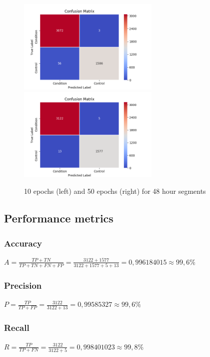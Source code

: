 \begin{figure}
      \begin{multicols}{2}
            \includegraphics[height=4.5cm]{img/control_condition/conf_2880_60_10_32.png}
            \includegraphics[height=4.5cm]{img/control_condition/conf_2880_60_50_32.png}
      \end{multicols}
      \caption{10 epochs (left) and 50 epochs (right) for 48 hour segments}
      \label{figure:control_condition_confusion_matrix_48h}
\end{figure}


\subsection{Performance metrics}

\subsubsection{Accuracy}
$ A = \frac{TP+TN}{TP+TN+FN+FP} = \frac{3122+1577}{3122+1577+5+13} = 0,996184015 \approx 99,6\%$

\subsubsection{Precision}
$ P = \frac{TP}{TP+FP} = \frac{3122}{3122+13} = 0,99585327 \approx 99,6\%$

\subsubsection{Recall}
$ R = \frac{TP}{TP+FN} = \frac{3122}{3122+5} = 0,998401023 \approx 99,8\%$

